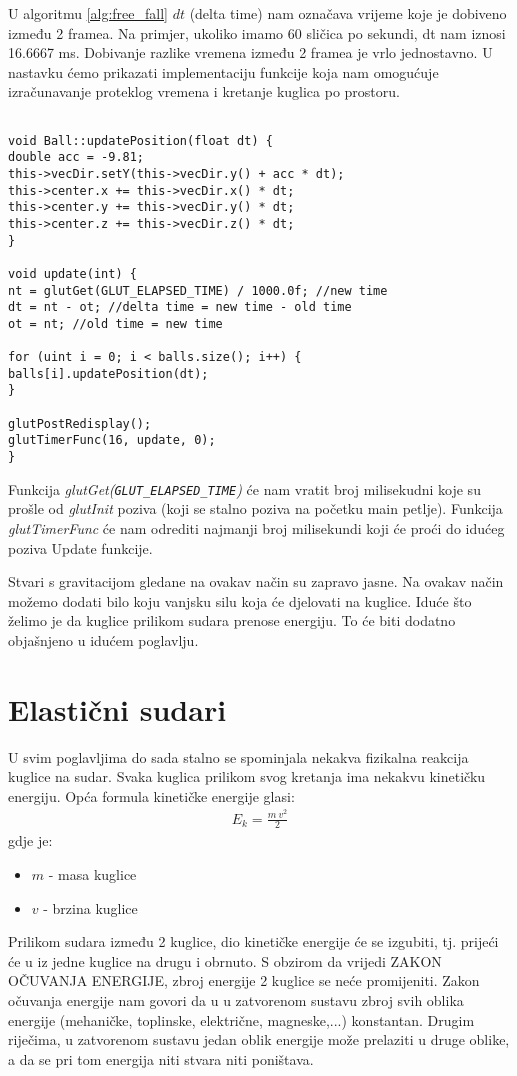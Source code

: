 U algoritmu \ref{alg:free_fall} $dt$ (delta time) nam označava vrijeme koje je dobiveno između 2 framea. Na primjer, ukoliko imamo 60 sličica po sekundi, dt nam iznosi 16.6667 ms. Dobivanje razlike vremena između 2 framea je vrlo jednostavno. U nastavku ćemo prikazati implementaciju funkcije koja nam omogućuje izračunavanje proteklog vremena i kretanje kuglica po prostoru. \newpage
\begin{lstlisting}[style = myC++, label = {code:12}, caption = {Implementacije update funkcija}]

void Ball::updatePosition(float dt) {
double acc = -9.81;
this->vecDir.setY(this->vecDir.y() + acc * dt);
this->center.x += this->vecDir.x() * dt;
this->center.y += this->vecDir.y() * dt;
this->center.z += this->vecDir.z() * dt;
}

void update(int) {
nt = glutGet(GLUT_ELAPSED_TIME) / 1000.0f; //new time
dt = nt - ot; //delta time = new time - old time
ot = nt; //old time = new time

for (uint i = 0; i < balls.size(); i++) {
balls[i].updatePosition(dt);
}

glutPostRedisplay();
glutTimerFunc(16, update, 0);
}
\end{lstlisting}

Funkcija \emph{glutGet(\texttt{GLUT\_ELAPSED\_TIME})} će nam vratit broj milisekudni koje su prošle od \emph{glutInit} poziva (koji se stalno poziva na početku main petlje). Funkcija \emph{glutTimerFunc} će nam odrediti najmanji broj milisekundi koji će proći do idućeg poziva Update funkcije.

Stvari s gravitacijom gledane na ovakav način su zapravo jasne. Na ovakav način možemo dodati bilo koju vanjsku silu koja će djelovati na kuglice. Iduće što želimo je da kuglice prilikom sudara prenose energiju. To će biti dodatno objašnjeno u idućem poglavlju.\newpage
\section{Elastični sudari}
U svim poglavljima do sada stalno se spominjala nekakva fizikalna reakcija kuglice na sudar. Svaka kuglica prilikom svog kretanja ima nekakvu kinetičku energiju. Opća formula kinetičke energije glasi:
\begin{equation}\label{equ:kinetic}
	\begin{aligned}
	E_{k} = \frac{m \ v^2}{2}
	\end{aligned}
\end{equation}
gdje je:
\begin{itemize}
	\item $m$ - masa kuglice 
	\item $v$ - brzina kuglice
\end{itemize}
Prilikom sudara između 2 kuglice, dio kinetičke energije će se izgubiti, tj. prijeći će u iz jedne kuglice na drugu i obrnuto. S obzirom da vrijedi ZAKON OČUVANJA ENERGIJE, zbroj energije 2 kuglice se neće promijeniti. Zakon očuvanja energije nam govori da u u zatvorenom sustavu zbroj svih oblika energije (mehaničke, toplinske, električne, magneske,...) konstantan. Drugim riječima, u zatvorenom sustavu jedan oblik energije može prelaziti u druge oblike, a da se pri tom energija niti stvara niti poništava\cite{11}.

